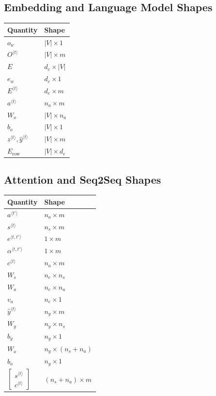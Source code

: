 \subsection{Embedding and Language Model Shapes}

\begin{center}
\begin{tabular}{ll}
\toprule
Quantity & Shape \\
\midrule
$o_w$ & $\lvert V\rvert \times 1$ \\
$O^{\langle t\rangle}$ & $\lvert V\rvert \times m$ \\
$E$ & $d_e \times \lvert V\rvert$ \\
$e_w$ & $d_e \times 1$ \\
$E^{\langle t\rangle}$ & $d_e \times m$ \\
$a^{\langle t\rangle}$ & $n_a \times m$ \\
$W_o$ & $\lvert V\rvert \times n_a$ \\
$b_o$ & $\lvert V\rvert \times 1$ \\
$z^{\langle t\rangle},\hat{y}^{\langle t\rangle}$ & $\lvert V\rvert \times m$ \\
$E_{\mathrm{row}}$ & $\lvert V\rvert \times d_e$ \\
\bottomrule
\end{tabular}
\end{center}

\subsection{Attention and Seq2Seq Shapes}

\begin{center}
\begin{tabular}{ll}
\toprule
Quantity & Shape \\
\midrule
$a^{\langle t'\rangle}$ & $n_a \times m$ \\
$s^{\langle t\rangle}$ & $n_s \times m$ \\
$e^{\langle t,t'\rangle}$ & $1 \times m$ \\
$\alpha^{\langle t,t'\rangle}$ & $1 \times m$ \\
$c^{\langle t\rangle}$ & $n_a \times m$ \\
$W_s$ & $n_e \times n_s$ \\
$W_a$ & $n_e \times n_a$ \\
$v_a$ & $n_e \times 1$ \\
$\hat{y}^{\langle t\rangle}$ & $n_y \times m$ \\
$W_y$ & $n_y \times n_s$ \\
$b_y$ & $n_y \times 1$ \\
$W_o$ & $n_y \times (n_s+n_a)$ \\
$b_o$ & $n_y \times 1$ \\
$\begin{bmatrix}s^{\langle t\rangle}\\ c^{\langle t\rangle}\end{bmatrix}$ & $(n_s+n_a)\times m$ \\
\bottomrule
\end{tabular}
\end{center}

